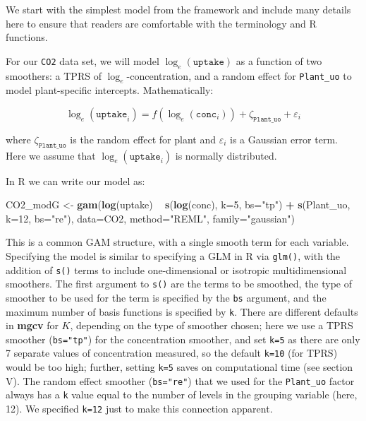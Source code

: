 \documentclass[12pt]{article}
\newenvironment{Shaded}{\begin{snugshade}}{\end{snugshade}}
\newcommand{\KeywordTok}[1]{\textcolor[rgb]{0.13,0.29,0.53}{\textbf{#1}}}
\newcommand{\DataTypeTok}[1]{\textcolor[rgb]{0.13,0.29,0.53}{#1}}
\newcommand{\DecValTok}[1]{\textcolor[rgb]{0.00,0.00,0.81}{#1}}
\newcommand{\StringTok}[1]{\textcolor[rgb]{0.31,0.60,0.02}{#1}}
\newcommand{\OperatorTok}[1]{\textcolor[rgb]{0.81,0.36,0.00}{\textbf{#1}}}
\newcommand{\NormalTok}[1]{#1}
\begin{document}
We start with the simplest model from the framework and include many
details here to ensure that readers are comfortable with the terminology
and R functions.

For our \texttt{CO2} data set, we will model \(\log_e(\texttt{uptake})\)
as a function of two smoothers: a TPRS of \(\log_e\)-concentration, and
a random effect for \texttt{Plant\_uo} to model plant-specific
intercepts. Mathematically:

\[
\log_e(\texttt{uptake}_i) = f(\log_e(\texttt{conc}_i)) + \zeta_\texttt{Plant\_uo} + \varepsilon_i
\]

where \(\zeta_\texttt{Plant\_uo}\) is the random effect for plant and
\(\varepsilon_i\) is a Gaussian error term. Here we assume that
\(\log_e(\texttt{uptake}_i)\) is normally distributed.

In R we can write our model as:

\begin{Shaded}
\begin{Highlighting}[]
\NormalTok{CO2_modG <-}\StringTok{ }\KeywordTok{gam}\NormalTok{(}\KeywordTok{log}\NormalTok{(uptake) }\OperatorTok{~}\StringTok{ }\KeywordTok{s}\NormalTok{(}\KeywordTok{log}\NormalTok{(conc), }\DataTypeTok{k=}\DecValTok{5}\NormalTok{, }\DataTypeTok{bs=}\StringTok{"tp"}\NormalTok{) }\OperatorTok{+}
\StringTok{                  }\KeywordTok{s}\NormalTok{(Plant_uo, }\DataTypeTok{k=}\DecValTok{12}\NormalTok{, }\DataTypeTok{bs=}\StringTok{"re"}\NormalTok{),}
                \DataTypeTok{data=}\NormalTok{CO2, }\DataTypeTok{method=}\StringTok{"REML"}\NormalTok{, }\DataTypeTok{family=}\StringTok{"gaussian"}\NormalTok{)}
\end{Highlighting}
\end{Shaded}

This is a common GAM structure, with a single smooth term for each
variable. Specifying the model is similar to specifying a GLM in R via
\texttt{glm()}, with the addition of \texttt{s()} terms to include
one-dimensional or isotropic multidimensional smoothers. The first
argument to \texttt{s()} are the terms to be smoothed, the type of
smoother to be used for the term is specified by the \texttt{bs}
argument, and the maximum number of basis functions is specified by
\texttt{k}. There are different defaults in \textbf{mgcv} for \(K\),
depending on the type of smoother chosen; here we use a TPRS smoother
(\texttt{bs="tp"}) for the concentration smoother, and set \texttt{k=5}
as there are only 7 separate values of concentration measured, so the
default \texttt{k=10} (for TPRS) would be too high; further, setting
\texttt{k=5} saves on computational time (see section V). The random
effect smoother (\texttt{bs="re"}) that we used for the
\texttt{Plant\_uo} factor always has a \texttt{k} value equal to the
number of levels in the grouping variable (here, 12). We specified
\texttt{k=12} just to make this connection apparent.
\end{document}
